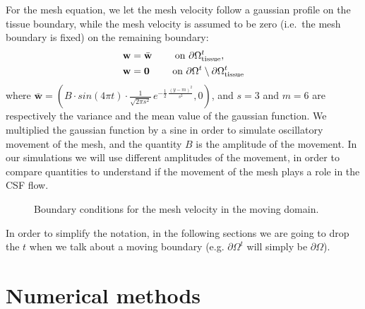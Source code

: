 \documentclass[a4paper,11pt,oneside]{book}
\begin{document}
For the mesh equation, we let the mesh velocity follow a gaussian profile on the tissue boundary, while the mesh velocity is assumed to
be zero (i.e.~the mesh boundary is fixed) on the remaining boundary:
\begin{align}
\label{eq:bc:5}
\mathbf{w} &= \bar{\mathbf{w}}  \qquad \text{ on } \partial \Omega_{\rm tissue}^t,\\
\mathbf{w} &= \mathbf{0}  \qquad \text{ on } \partial \Omega^t \setminus \partial \Omega_{\rm tissue}^t
\end{align}
where $\bar{\mathbf{w}} = (B \cdot sin(4\pi t) \cdot \frac{1}{\sqrt{2 \pi s^2}} \, e^{- \frac{1}{2} \, \frac{(y - m)^2}{s^2}}  , 0)$, and $s = 3$ and $m = 6$ are respectively the variance and the mean value of the gaussian function. We multiplied the gaussian function by a sine in order to simulate oscillatory movement of the mesh, and the quantity $B$ is the amplitude of the movement. In our simulations we will use different amplitudes of the movement, in order to compare quantities to understand if the movement of the mesh plays a role in the CSF flow.

\begin{figure}[h!]
\centering
{}
\caption{Boundary conditions for the mesh velocity in the moving domain.}
\label{img:cns:5}
\end{figure}


In order to simplify the notation, in the following sections we are going to drop the $t$ when we talk about a moving boundary (e.g. $\partial \Omega^t$ will simply be $\partial \Omega$).




\chapter{Numerical methods}
\end{document}
